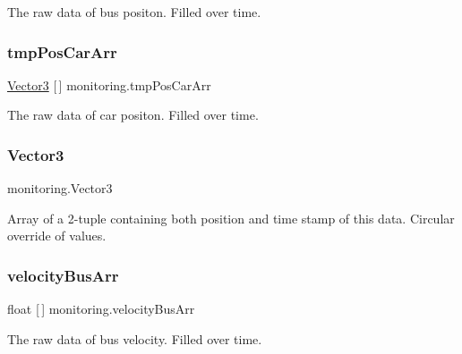 The raw data of bus positon. Filled over time.

\mbox{\label{classmonitoring_ac92542c319fc95a3b1126dba86a675de}} 
\subsubsection{\texorpdfstring{tmp\+Pos\+Car\+Arr}{tmpPosCarArr}}
{\footnotesize\ttfamily \hyperlink{classmonitoring_a4a225f8529921b2f6b38156cf3b296cf}{Vector3} \mbox{[}$\,$\mbox{]} monitoring.\+tmp\+Pos\+Car\+Arr\hspace{0.3cm}{\ttfamily [private]}}



The raw data of car positon. Filled over time.

\mbox{\label{classmonitoring_a4a225f8529921b2f6b38156cf3b296cf}} 
\subsubsection{\texorpdfstring{Vector3}{Vector3}}
{\footnotesize\ttfamily monitoring.\+Vector3}



Array of a 2-\/tuple containing both position and time stamp of this data. Circular override of values.

\mbox{\label{classmonitoring_ade021e7adddbe127c8dd4413fac36483}} 
\subsubsection{\texorpdfstring{velocity\+Bus\+Arr}{velocityBusArr}}
{\footnotesize\ttfamily float \mbox{[}$\,$\mbox{]} monitoring.\+velocity\+Bus\+Arr\hspace{0.3cm}{\ttfamily [private]}}



The raw data of bus velocity. Filled over time.

\mbox{\label{classmonitoring_ad1c1a9788538be54e5cc7cf23d11424e}} 
